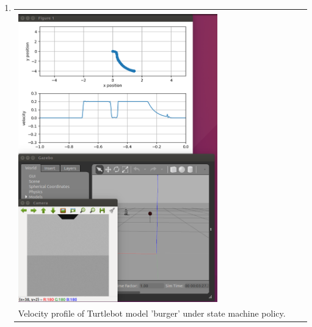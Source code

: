 \documentclass{article}
\begin{document}
\begin{enumerate}[label=(\roman*)]
\item %
\begin{tabular}[t]{l}
	\hline \\
	\includegraphics[width=0.7\textwidth]{img/vel_profile.png} \\
	\hline
	Velocity profile of Turtlebot model 'burger' under state machine policy. \\
\end{tabular}
	
\end{enumerate}
\end{document}
